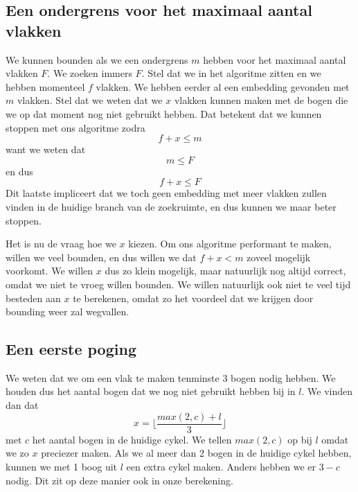 \documentclass{article}
\begin{document}
\subsection{Een ondergrens voor het maximaal aantal vlakken}
\label{ondergrens-maximaal-aantal-vlakken}
We kunnen bounden als we een ondergrens $m$ hebben voor het maximaal aantal
vlakken $F$. We zoeken immers $F$. Stel dat we in het algoritme zitten en we
hebben momenteel $f$ vlakken. We hebben eerder al een embedding gevonden met
$m$ vlakken. Stel dat we weten dat we $x$ vlakken kunnen maken met de bogen die
we op dat moment nog niet gebruikt hebben. Dat betekent dat we kunnen stoppen
met ons algoritme zodra
\begin{equation*}
f + x \leq m
\end{equation*}
want we weten dat
\begin{equation*}
m \leq F
\end{equation*}
en dus
\begin{equation*}
f + x \leq F
\end{equation*}
Dit laatste impliceert dat we toch geen embedding met meer vlakken zullen vinden
in de huidige branch van de zoekruimte, en dus kunnen we maar beter stoppen.
\newline

Het is nu de vraag hoe we $x$ kiezen. Om ons algoritme performant te maken,
willen we veel bounden, en dus willen we dat $f + x < m$ zoveel mogelijk
voorkomt. We willen $x$ dus zo klein mogelijk, maar natuurlijk nog altijd
correct, omdat we niet te vroeg willen bounden. We willen natuurlijk ook niet
te veel tijd besteden aan $x$ te berekenen, omdat zo het voordeel dat we krijgen
door bounding weer zal wegvallen.

\subsection{Een eerste poging}
\label{een-eerste-poging}
We weten dat we om een vlak te maken tenminste 3 bogen nodig hebben. We
houden dus het aantal bogen dat we nog niet gebruikt hebben bij in $l$. We vinden
dan dat
\begin{equation*}
x = \lfloor\frac{max(2, c) + l}{3}\rfloor
\end{equation*}
met $c$ het aantal bogen in de huidige cykel. We tellen $max(2, c)$ op bij $l$
omdat we zo $x$ preciezer maken. Als we al meer dan 2 bogen in de huidige
cykel hebben, kunnen we met 1 boog uit $l$ een extra cykel maken. Anders
hebben we er $3 - c$ nodig. Dit zit op deze manier ook in onze berekening.
\newline
\end{document}
